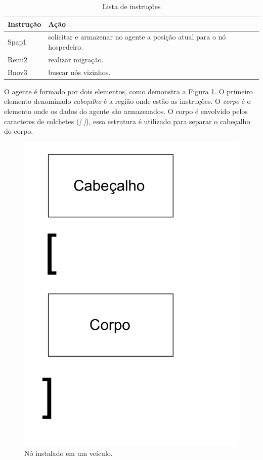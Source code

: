 \begin{table}[ht]
	\centering
	\begin{tabular}{ | l | l |}
		\hline
		Instrução &  Ação \\ \hline
		Spap1 & solicitar e armazenar no agente a posição atual para o nó hospedeiro.\\ \hline
		Remi2 & realizar migração.\\ \hline
		Bnov3 & buscar nós vizinhos. \\ \hline 
	\end{tabular}
	\caption{Lista de instruções}
	\label{tab:instrucoesAgente}
\end{table}

O agente é formado por dois elementos, como demonstra a Figura \ref{fig:estruturaAgente}. O primeiro elemento denominado \emph{cabeçalho} é a região onde estão as instruções. O \emph{corpo} é o elemento onde os dados do agente são armazenados. O corpo é envolvido pelos caracteres de colchetes (\emph{[ ]}), essa estrutura é utilizado para separar o cabeçalho do corpo.

\begin{figure}[htbp]
	\centering
	\includegraphics[scale=0.25]{metodologia/figuras/estruturaAgente.pdf}
	\caption{Nó instalado em um veículo.}
	\label{fig:estruturaAgente}
\end{figure}


